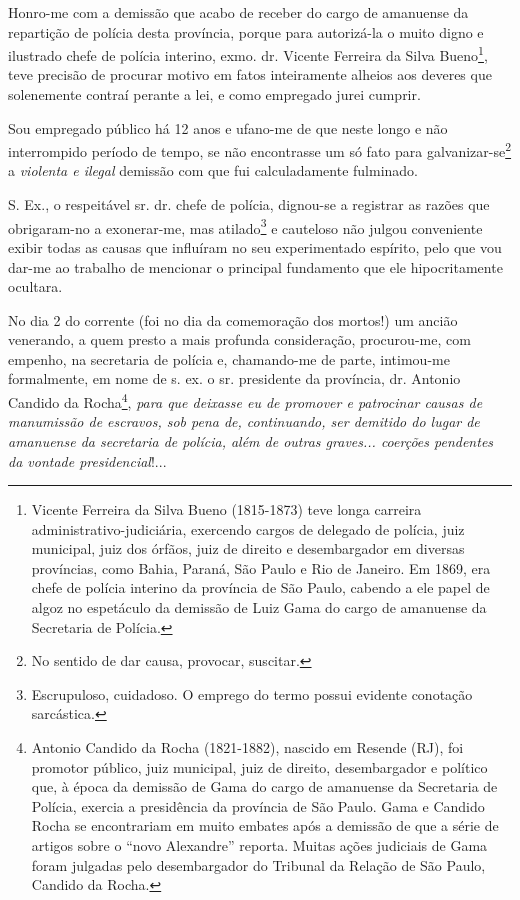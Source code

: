 Honro-me com a demissão que acabo de receber do cargo de amanuense da
repartição de polícia desta província, porque para autorizá-la o muito
digno e ilustrado chefe de polícia interino, exmo. dr. Vicente Ferreira
da Silva Bueno\footnote{Vicente Ferreira da Silva Bueno (1815-1873)
  teve longa carreira administrativo-judiciária, exercendo cargos de
  delegado de polícia, juiz municipal, juiz dos órfãos, juiz de direito
  e desembargador em diversas províncias, como Bahia, Paraná, São Paulo
  e Rio de Janeiro. Em 1869, era chefe de polícia interino da província
  de São Paulo, cabendo a ele papel de algoz no espetáculo da demissão
  de Luiz Gama do cargo de amanuense da Secretaria de Polícia.}, teve
precisão de procurar motivo em fatos inteiramente alheios aos deveres
que solenemente contraí perante a lei, e como empregado jurei cumprir.

Sou empregado público há 12 anos e ufano-me de que neste longo e não
interrompido período de tempo, se não encontrasse um só fato para
galvanizar-se\footnote{No sentido de dar causa, provocar, suscitar.} a
\emph{violenta e ilegal} demissão com que fui calculadamente fulminado.

S. Ex., o respeitável sr. dr. chefe de polícia, dignou-se a registrar as
razões que obrigaram-no a exonerar-me, mas atilado\footnote{
  Escrupuloso, cuidadoso. O emprego do termo possui evidente conotação
  sarcástica.} e cauteloso não julgou conveniente exibir todas as causas
que influíram no seu experimentado espírito, pelo que vou dar-me ao
trabalho de mencionar o principal fundamento que ele hipocritamente
ocultara.

No dia 2 do corrente (foi no dia da comemoração dos mortos!) um ancião
venerando, a quem presto a mais profunda consideração, procurou-me, com
empenho, na secretaria de polícia e, chamando-me de parte, intimou-me
formalmente, em nome de s. ex. o sr. presidente da província, dr.
Antonio Candido da Rocha\footnote{Antonio Candido da Rocha
  (1821-1882), nascido em Resende (RJ), foi promotor público, juiz
  municipal, juiz de direito, desembargador e político que, à época da
  demissão de Gama do cargo de amanuense da Secretaria de Polícia,
  exercia a presidência da província de São Paulo. Gama e Candido Rocha
  se encontrariam em muito embates após a demissão de que a série de
  artigos sobre o ``novo Alexandre'' reporta. Muitas ações judiciais de
  Gama foram julgadas pelo desembargador do Tribunal da Relação de São
  Paulo, Candido da Rocha.}, \emph{para que deixasse eu de promover e
patrocinar causas de manumissão de escravos, sob pena de, continuando,
ser demitido do lugar de amanuense da secretaria de polícia, além de
outras graves... coerções pendentes da vontade presidencial}!...

